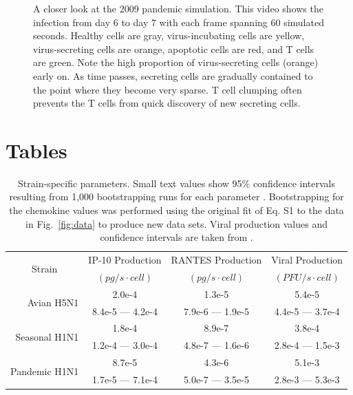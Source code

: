 \documentclass[10pt]{article}
\begin{document}
\begin{figure}[ht!]
\caption{A closer look at the 2009 pandemic simulation.  This video shows the infection from day 6 to day 7 with each frame spanning 60 simulated seconds.  Healthy cells are gray, virus-incubating cells are yellow, virus-secreting cells are orange, apoptotic cells are red, and T cells are green.  Note the high proportion of virus-secreting cells (orange) early on.  As time passes, secreting cells are gradually contained to the point where they become very sparse.  T cell clumping often prevents the T cells from quick discovery of new secreting cells.}
\end{figure}

\pagebreak

\section*{Tables}



\begin{table}[!ht]
\centering
\begin{tabular}{ | r | c | c | c | }
  \hline                        
  \multicolumn{1}{|c|}{\multirow{2}{*}{Strain}} & IP-10 Production & RANTES Production & Viral Production \\
   & \footnotesize{$(pg/s\cdot cell)$}  & \footnotesize{$(pg/s\cdot cell)$} &  \footnotesize{$(PFU/s\cdot cell)$} \\
  \hline
  \multirow{2}{*}{Avian H5N1} & 2.0e-4 &  1.3e-5 & 5.4e-5 \\
   &  \footnotesize{8.4e-5 --- 4.2e-4} & \footnotesize{7.9e-6 --- 1.9e-5} & \footnotesize{4.4e-5 --- 3.7e-4}\\ 
   \hline
  \multirow{2}{*}{Seasonal H1N1} & 1.8e-4 &  8.9e-7 & 3.8e-4 \\
   & \footnotesize{1.2e-4 --- 3.0e-4} & \footnotesize{4.8e-7 --- 1.6e-6} & \footnotesize{2.8e-4 --- 1.5e-3}\\
   \hline
  \multirow{2}{*}{Pandemic H1N1} & 8.7e-5 &  4.3e-6 & 5.1e-3 \\
   & \footnotesize{1.7e-5 --- 7.1e-4} & \footnotesize{5.0e-7 --- 3.5e-5} & \footnotesize{2.8e-3 --- 5.3e-3} \\
  \hline
\end{tabular}
\caption{Strain-specific parameters.  Small text values show 95\% confidence intervals resulting from 1,000 bootstrapping runs for each parameter \cite{Wu1986}.  Bootstrapping for the chemokine values was performed using the original fit of Eq. S1 to the data in Fig.~\ref{fig:data} to produce new data sets.  Viral production values and confidence intervals are taken from \cite{Mitchell2011}.}
\label{tab:strains}
\end{table}
\end{document}
